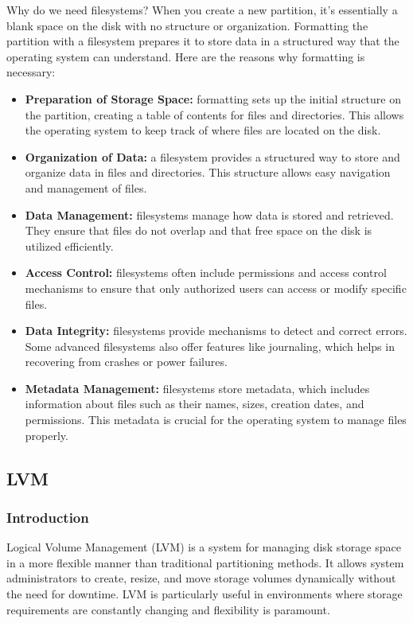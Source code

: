 \documentclass{article}
\begin{document}
Why do we need filesystems? When you create a new partition, it's essentially a blank space on the disk with no structure or organization. Formatting the partition with a filesystem prepares it to store data in a structured way that the operating system can understand. Here are the reasons why formatting is necessary:

\begin{itemize}
    \item \textbf{Preparation of Storage Space:} formatting sets up the initial structure on the partition, creating a table of contents for files and directories. This allows the operating system to keep track of where files are located on the disk.
    \item \textbf{Organization of Data:} a filesystem provides a structured way to store and organize data in files and directories. This structure allows easy navigation and management of files.
    \item \textbf{Data Management:} filesystems manage how data is stored and retrieved. They ensure that files do not overlap and that free space on the disk is utilized efficiently.
    \item \textbf{Access Control:} filesystems often include permissions and access control mechanisms to ensure that only authorized users can access or modify specific files.
    \item \textbf{Data Integrity:} filesystems provide mechanisms to detect and correct errors. Some advanced filesystems also offer features like journaling, which helps in recovering from crashes or power failures.
    \item \textbf{Metadata Management:} filesystems store metadata, which includes information about files such as their names, sizes, creation dates, and permissions. This metadata is crucial for the operating system to manage files properly.
\end{itemize}

\subsection{LVM}

\subsubsection{Introduction}
Logical Volume Management (LVM) is a system for managing disk storage space in a more flexible manner than traditional partitioning methods. It allows system administrators to create, resize, and move storage volumes dynamically without the need for downtime. LVM is particularly useful in environments where storage requirements are constantly changing and flexibility is paramount.
\end{document}
